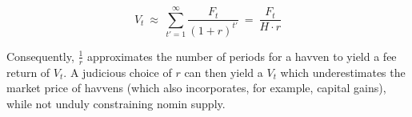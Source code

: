 \vspace{2mm}

\begin{equation} 
    V_t \ \approx \ \sum_{t'=1}^{\infty} \frac{F_t}{{(1 + r)}^{t'}} \ = \ \frac{F_t}{H \cdot r} \label{eq:havvenvalue}
\end{equation}

\vspace{3mm}

\noindent Consequently, \(\frac{1}{r}\) approximates the number of periods for
a havven to yield a fee return of \(V_t\). A judicious choice of \(r\) can then
yield a \(V_t\) which underestimates the market price of havvens (which also
incorporates, for example, capital gains), while not unduly constraining
nomin supply.
